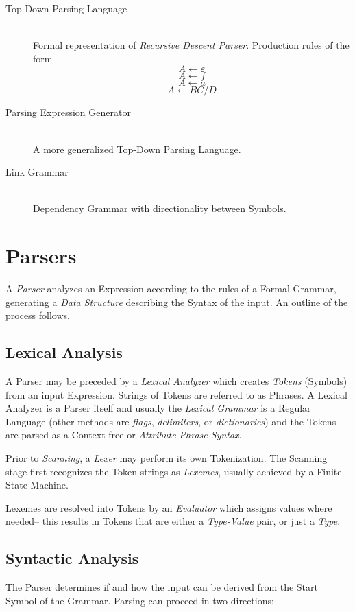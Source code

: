 \documentclass{article}
\begin{document}
\begin{description}
\item[Top-Down Parsing Language] \hfill \\
Formal representation of \emph{Recursive Descent Parser}. Production
rules of the form
\[
    A \leftarrow \varepsilon
\]\[
    A \leftarrow f
\]\[
    A \leftarrow a
\]\[
    A \leftarrow BC/D
\]
\item[Parsing Expression Generator] \hfill \\
A more generalized Top-Down Parsing Language.
\item[Link Grammar] \hfill \\
Dependency Grammar with directionality between Symbols.
\end{description}

\section{Parsers} \label{sec:parsers}

A \emph{Parser} analyzes an Expression according to the rules of a Formal
Grammar, generating a \emph{Data Structure} describing the Syntax of
the input. An outline of the process follows.

\subsection{Lexical Analysis}
A Parser may be preceded by a \emph{Lexical Analyzer} which creates
\emph{Tokens} (Symbols) from an input Expression. Strings of Tokens
are referred to as Phrases. A Lexical Analyzer is a Parser itself and
usually the \emph{Lexical Grammar} is a Regular Language (other
methods are \emph{flags}, \emph{delimiters}, or \emph{dictionaries})
and the Tokens are parsed as a Context-free or \emph{Attribute Phrase
  Syntax}.

Prior to \emph{Scanning}, a \emph{Lexer} may perform its own
Tokenization.  The Scanning stage first recognizes the Token
strings as \emph{Lexemes}, usually achieved by a Finite State
Machine.

Lexemes are resolved into Tokens by an \emph{Evaluator} which assigns
values where needed-- this results in Tokens that are either a
\emph{Type-Value} pair, or just a \emph{Type}.

\subsection{Syntactic Analysis}
The Parser determines if and how the input can be derived from the
Start Symbol of the Grammar. Parsing can proceed in two directions:
\end{document}
